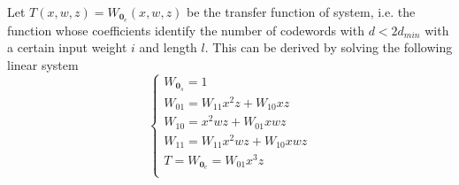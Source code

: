 \documentclass[10pt]{article}
\begin{document}
Let $T(x, w, z) = W_{\mathbf{0}_e} (x, w, z)$ be the transfer function of system, i.e. the function whose coefficients identify the number of codewords with $d < 2d_{min}$ with a certain input weight $i$ and length $l$. This can be derived by solving the following linear system
\begin{equation}\label{eq:s1}
\begin{cases}
	W_{\mathbf{0}_s} = 1 \\ %
	W_{01} = W_{11}x^2z + W_{10}xz \\
	W_{10} = x^2wz + W_{01}xwz \\
	W_{11} = W_{11}x^2wz + W_{10}xwz \\
	T = W_{\mathbf{0}_e} = W_{01}x^3z\\
\end{cases}
\end{equation}
\end{document}
